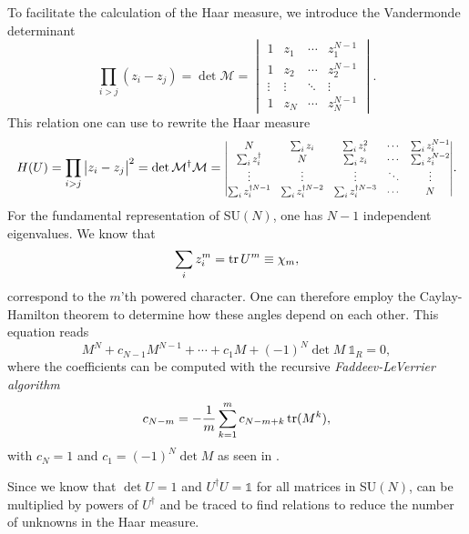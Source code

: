 To facilitate the calculation of the Haar measure, we introduce the Vandermonde
determinant
%
\begin{equation}
  \prod_{i>j} (z_i - z_j) = \det \mathcal{M} =
  \begin{vmatrix}
    1 & z_1 & \cdots & z_1^{N-1} \\
    1 & z_2 & \cdots & z_2^{N-1} \\
    \vdots & \vdots & \ddots & \vdots \\
    1 & z_N & \cdots & z_N^{N-1} 
  \end{vmatrix}.
\end{equation}
%
This relation one can use to rewrite the Haar measure
%
\begin{equation}
  H(U) = \prod_{i>j} \big| z_i - z_j \big|^2
   = \det \mathcal{M}^{\dagger} \mathcal{M} = \scalemath{0.8}{%
  \begin{vmatrix}
    N & \sum_i z_i & \sum_i z_i^2 & \cdots & \sum_i z_i^{N-1} \\
    \sum_i z_i^{\dagger} & N & \sum_i z_i & \cdots & \sum_i z_i^{N-2} \\
    \vdots & \vdots & \vdots & \ddots & \vdots \\
    \sum_i z_i^{\dagger N-1} & \sum_i z_i^{\dagger N-2} & \sum_i z_i^{\dagger N-3} & \cdots & N
  \end{vmatrix}}.
\end{equation}
%
For the fundamental representation of SU$(N)$, one has $N - 1$ independent
eigenvalues. We know that
%
\begin{equation}
  \sum_i z_i^m = \operatorname{tr} U^m \equiv \chi_m,
\end{equation}
%
correspond to the $m$'th powered character. One can therefore employ the
Caylay-Hamilton theorem to determine how these angles depend on each other.
This equation reads
%
\begin{equation} \label{eq:caylay-hamilton}
  M^N + c_{N-1} M^{N-1} + \cdots + c_1 M + (-1)^N \det M\: \mathbb{1}_R = 0,
\end{equation}
%
where the coefficients can be computed with the recursive \emph{Faddeev-LeVerrier
algorithm}
%
\begin{equation}
  c_{N-m} = -\frac{1}{m} \sum_{k=1}^m c_{N-m+k} \operatorname{tr} (M^k),
\end{equation}
%
with $c_N = 1$ and $c_1 = (-1)^N \det M$ as seen in .

Since we know that $\det U = 1$ and $U^{\dagger} U = \mathbb{1}$ for all
matrices in SU$(N)$,  can be multiplied by powers of
$U^{\dagger}$ and be traced to find relations to reduce the number of unknowns in
the Haar measure.

